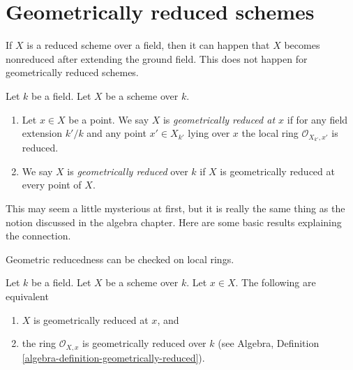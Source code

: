 \section{Geometrically reduced schemes}
\label{section-geometrically-reduced}

\noindent
If $X$ is a reduced scheme over a field, then it can happen that $X$
becomes nonreduced after extending the ground field. This does not happen
for geometrically reduced schemes.

\begin{definition}
\label{definition-geometrically-reduced}
Let $k$ be a field.
Let $X$ be a scheme over $k$.
\begin{enumerate}
\item Let $x \in X$ be a point.
We say $X$ is {\it geometrically reduced at $x$}
if for any field extension $k'/k$
and any point $x' \in X_{k'}$ lying over $x$
the local ring $\mathcal{O}_{X_{k'}, x'}$ is reduced.
\item We say $X$ is {\it geometrically reduced} over $k$
if $X$ is geometrically reduced at every point of $X$.
\end{enumerate}
\end{definition}

\noindent
This may seem a little mysterious at first, but it is
really the same thing as the notion discussed in the algebra chapter.
Here are some basic results explaining the connection.

\begin{lemma}
\label{lemma-geometrically-reduced-at-point}
\begin{slogan}
Geometric reducedness can be checked on local rings.
\end{slogan}
Let $k$ be a field.
Let $X$ be a scheme over $k$.
Let $x \in X$.
The following are equivalent
\begin{enumerate}
\item $X$ is geometrically reduced at $x$, and
\item the ring $\mathcal{O}_{X, x}$ is geometrically
reduced over $k$ (see
Algebra, Definition \ref{algebra-definition-geometrically-reduced}).
\end{enumerate}
\end{lemma}

